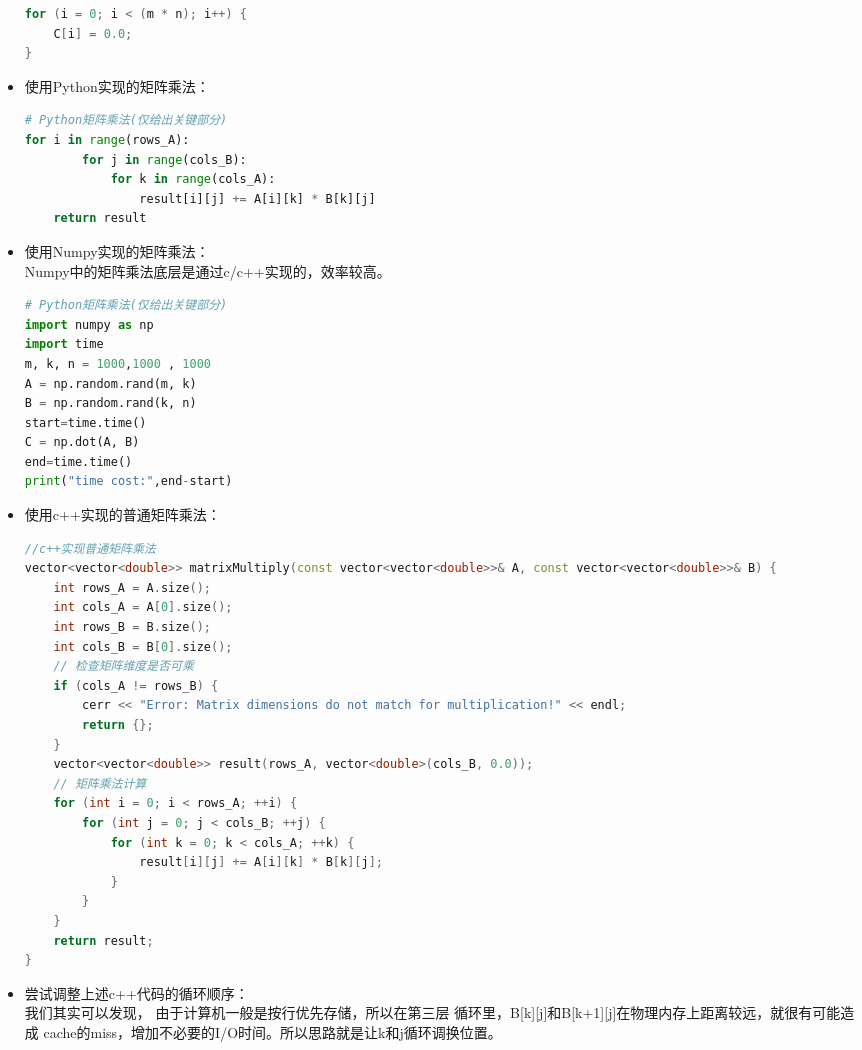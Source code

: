 \documentclass{SYSUReport}
\begin{document}
\begin{itemize}
\begin{lstlisting}[language=c]
for (i = 0; i < (m * n); i++) {
    C[i] = 0.0;
}
\end{lstlisting}
    \item 使用Python实现的矩阵乘法：
    
    \begin{lstlisting}[language=Python]
# Python矩阵乘法(仅给出关键部分)
for i in range(rows_A):          
        for j in range(cols_B):      
            for k in range(cols_A):  
                result[i][j] += A[i][k] * B[k][j]
    return result

    \end{lstlisting}
    \item 使用Numpy实现的矩阵乘法：\\Numpy中的矩阵乘法底层是通过c/c++实现的，效率较高。
\begin{lstlisting}[language=Python]
# Python矩阵乘法(仅给出关键部分)
import numpy as np
import time
m, k, n = 1000,1000 , 1000  
A = np.random.rand(m, k)    
B = np.random.rand(k, n)
start=time.time()
C = np.dot(A, B)
end=time.time()
print("time cost:",end-start)
    \end{lstlisting}
    \item 使用c++实现的普通矩阵乘法：
\begin{lstlisting}[language=c++]
//c++实现普通矩阵乘法
vector<vector<double>> matrixMultiply(const vector<vector<double>>& A, const vector<vector<double>>& B) {
    int rows_A = A.size();
    int cols_A = A[0].size();
    int rows_B = B.size();
    int cols_B = B[0].size();
    // 检查矩阵维度是否可乘
    if (cols_A != rows_B) {
        cerr << "Error: Matrix dimensions do not match for multiplication!" << endl;
        return {};
    }
    vector<vector<double>> result(rows_A, vector<double>(cols_B, 0.0));
    // 矩阵乘法计算
    for (int i = 0; i < rows_A; ++i) {
        for (int j = 0; j < cols_B; ++j) {
            for (int k = 0; k < cols_A; ++k) {
                result[i][j] += A[i][k] * B[k][j];
            }
        }
    }
    return result;
}
    \end{lstlisting}

\item 尝试调整上述c++代码的循环顺序：\\我们其实可以发现，
由于计算机一般是按行优先存储，所以在第三层
循环里，B[k][j]和B[k+1][j]在物理内存上距离较远，就很有可能造成
cache的miss，增加不必要的I/O时间。所以思路就是让k和j循环调换位置。


\end{itemize}
\end{document}
